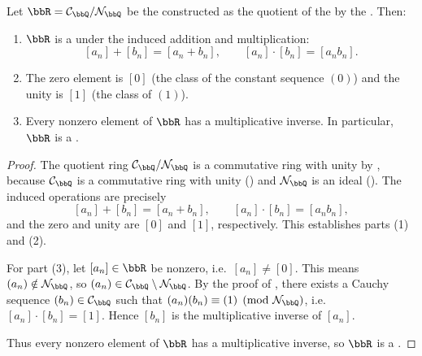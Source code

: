 \begin{proposition} \label{proposition:field_of_real_numbers_constructed_as_the_quotient_of_the_ring_of_cauchy_sequences_in_the_rational_numbers_modulo_the_null_sequences_is_indeed_a_field}
    Let $\bbR = \mathcal{C}_\bbQ / \mathcal{N}_\bbQ$ be the  constructed as the quotient of the  by the . Then:
    \begin{enumerate}
        \item $\bbR$ is a  under the induced addition and multiplication:
        $$[a_n] + [b_n] = [a_n + b_n], \qquad [a_n] \cdot [b_n] = [a_n b_n].$$
        \item The zero element is $[0]$ (the class of the constant sequence $(0)$) and the unity is $[1]$ (the class of $(1)$).
        \item Every nonzero element of $\bbR$ has a multiplicative inverse. In particular, $\bbR$ is a .
    \end{enumerate}
\end{proposition}

\begin{proof}
    The quotient ring $\mathcal{C}_\bbQ / \mathcal{N}_\bbQ$ is a commutative ring with unity by , because $\mathcal{C}_\bbQ$ is a commutative ring with unity () and $\mathcal{N}_\bbQ$ is an ideal (). The induced operations are precisely
    $$[a_n] + [b_n] = [a_n + b_n], \qquad [a_n] \cdot [b_n] = [a_n b_n],$$
    and the zero and unity are $[0]$ and $[1]$, respectively. This establishes parts (1) and (2).

    For part (3), let $[a_n] \in \bbR$ be nonzero, i.e.\ $[a_n] \neq [0]$. This means $(a_n) \notin \mathcal{N}_\bbQ$, so $(a_n) \in \mathcal{C}_\bbQ \setminus \mathcal{N}_\bbQ$. By the proof of , there exists a Cauchy sequence $(b_n) \in \mathcal{C}_\bbQ$ such that $(a_n)(b_n) \equiv (1) \pmod{\mathcal{N}_\bbQ}$, i.e.\ $[a_n] \cdot [b_n] = [1]$. Hence $[b_n]$ is the multiplicative inverse of $[a_n]$.

    Thus every nonzero element of $\bbR$ has a multiplicative inverse, so $\bbR$ is a .
\end{proof}